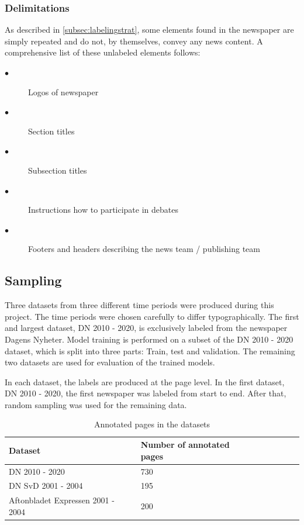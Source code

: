 \documentclass[oneside, english, bibtex]{kththesis}
\begin{document}
\subsubsection{Delimitations}

As described in \autoref{subsec:labelingstrat}, some elements found in the newspaper are simply repeated and do not, by themselves, convey any news content.
A comprehensive list of these unlabeled elements follows:

\begin{description}
\item[$\bullet$] Logos of newspaper
\item[$\bullet$] Section titles
\item[$\bullet$] Subsection titles
\item[$\bullet$] Instructions how to participate in debates
\item[$\bullet$] Footers and headers describing the news team / publishing team
\end{description}


\subsection{Sampling}

Three datasets from three different time periods were produced during this project.
The time periods were chosen carefully to differ typographically.
The first and largest dataset, DN 2010 - 2020,
is exclusively labeled from the newspaper Dagens Nyheter.
Model training is performed on a subset of the DN 2010 - 2020 dataset,
which is split into three parts: Train, test and validation.
The remaining two datasets are used for evaluation of the trained models.

In each dataset, the labels are produced at the page level.
In the first dataset, DN 2010 - 2020, the first newspaper was labeled from start to end.
After that, random sampling was used for the remaining data.

\begin{table}[!ht]
  \begin{center}
    \caption{Annotated pages in the datasets}
    \label{tab:pagedist}
    \begin{tabular}{l|l|l|l|l|l|l} %
    \textbf{Dataset} & \textbf{Number of annotated pages} \\
    \hline
    DN 2010 - 2020 & 730 \\    \hline
    DN SvD 2001 - 2004 & 195 \\    \hline
    Aftonbladet Expressen 2001 - 2004 & 200  \\    \hline
    \end{tabular}
  \end{center}
\end{table}
\end{document}
